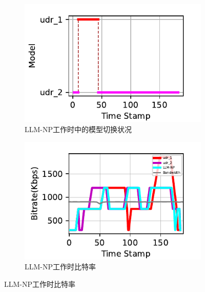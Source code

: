 \begin{figure}[ht]
\centering
\begin{subfigure}[t]{0.47\linewidth}
  \centering
  \includegraphics[width=\linewidth]{figures/chap04/evaluation_single_algo_detail/model_88_plot.pdf}
  \caption{LLM-NP工作时中的模型切换状况}
  \label{detail_model_switch}
\end{subfigure}
\begin{subfigure}[t]{0.47\linewidth}
  \centering
  \includegraphics[width=\linewidth]{figures/chap04/evaluation_single_algo_detail/bitrate_88_plot.pdf}
  \caption{LLM-NP工作时比特率}
  \label{detail_bitrate}
\end{subfigure}%


\end{figure}
